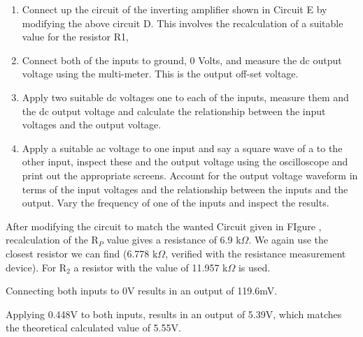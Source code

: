 \begin{enumerate}
	\item Connect up the circuit of the inverting amplifier shown in Circuit E by modifying the above
circuit D. This involves the recalculation of a suitable value for the resistor R1,

	\item Connect both of the inputs to ground, 0 Volts, and measure the dc output voltage using the
multi-meter. This is the output off-set voltage.


	\item Apply two suitable dc voltages one to each of the inputs, measure them and the dc output
voltage and calculate the relationship between the input voltages and the output voltage.


	\item Apply a suitable ac voltage to one input and say a square wave of a to the other input,
inspect these and the output voltage using the oscilloscope and print out the appropriate
screens. Account for the output voltage waveform in terms of the input voltages and the
relationship between the inputs and the output. Vary the frequency of one of the inputs and
inspect the results.

\end{enumerate}
%
%

After modifying the circuit to match the wanted Circuit given in FIgure , recalculation of the R$_P$ value gives a resistance of 6.9 k$\Omega$. We again use the closest resistor we can find (6.778 k$\Omega$, verified with the resistance measurement device).
For R$_2$ a resistor with the value of 11.957 k$\Omega$ is used.

Connecting both inputs to 0V results in an output of 119.6mV.

Applying 0.448V to both inputs, results in an output of 5.39V, which matches the theoretical calculated value of 5.55V. 

